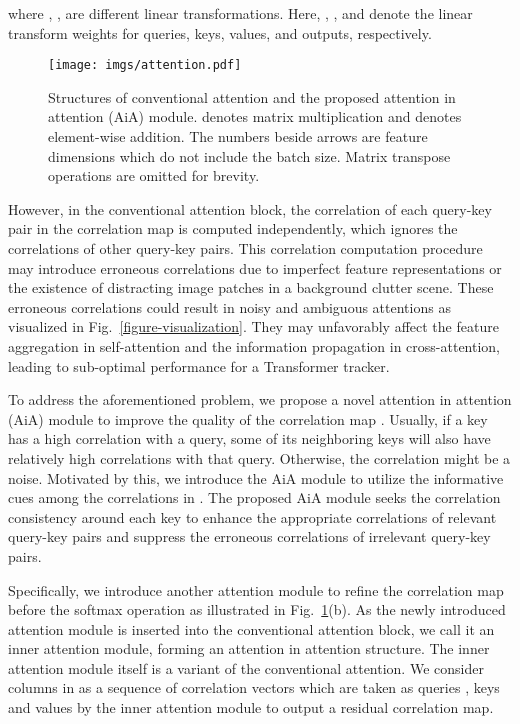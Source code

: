 \documentclass[runningheads]{llncs}
\begin{document}
where , ,  are different linear transformations. Here, , ,  and  denote the linear transform weights for queries, keys, values, and outputs, respectively.

\begin{figure}[t]
\centering
\texttt{[image: imgs/attention.pdf]}
\caption{Structures of conventional attention and the proposed attention in attention (AiA) module.  denotes matrix multiplication and  denotes element-wise addition. The numbers beside arrows are feature dimensions which do not include the batch size. Matrix transpose operations are omitted for brevity.}
\label{figure-attention}
\end{figure}

However, in the conventional attention block, the correlation of each query-key pair in the correlation map  is computed independently, which ignores the correlations of other query-key pairs. This correlation computation procedure may introduce erroneous correlations due to imperfect feature representations or the existence of distracting image patches in a background clutter scene. These erroneous correlations could result in noisy and ambiguous attentions as visualized in Fig.~\ref{figure-visualization}. They may unfavorably affect the feature aggregation in self-attention and the information propagation in cross-attention, leading to sub-optimal performance for a Transformer tracker.

To address the aforementioned problem, we propose a novel attention in attention (AiA) module to improve the quality of the correlation map . Usually, if a key has a high correlation with a query, some of its neighboring keys will also have relatively high correlations with that query. Otherwise, the correlation might be a noise. Motivated by this, we introduce the AiA module to utilize the informative cues among the correlations in . The proposed AiA module seeks the correlation consistency around each key to enhance the appropriate correlations of relevant query-key pairs and suppress the erroneous correlations of irrelevant query-key pairs.

Specifically, we introduce another attention module to refine the correlation map  before the softmax operation as illustrated in Fig.~\ref{figure-attention}(b). As the newly introduced attention module is inserted into the conventional attention block, we call it an inner attention module, forming an attention in attention structure. The inner attention module itself is a variant of the conventional attention. We consider columns in  as a sequence of correlation vectors which are taken as queries , keys  and values  by the inner attention module to output a residual correlation map.
\end{document}
